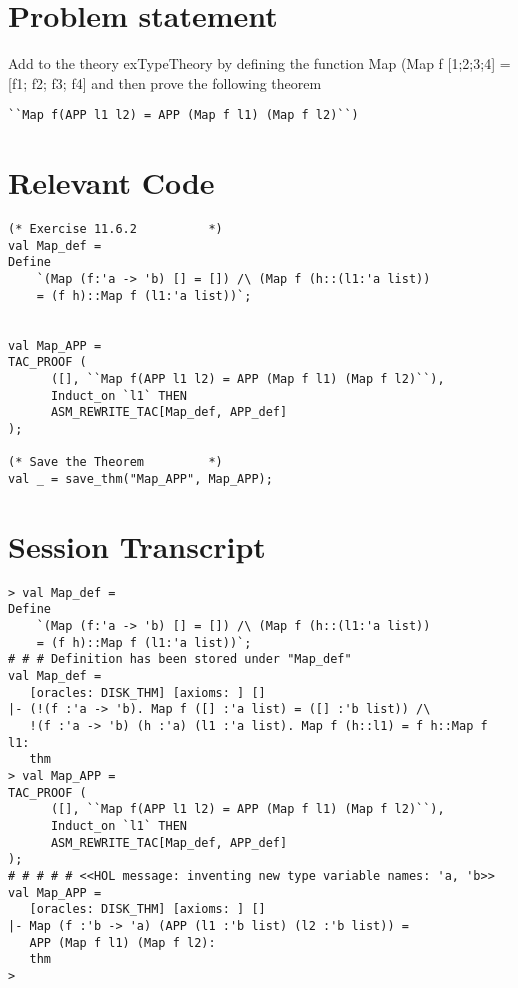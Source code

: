 \documentclass{report}
\begin{document}
\section{Problem statement}
\label{problem-statement-11-6-2}
Add to the theory exTypeTheory by defining the function Map (Map f
[1;2;3;4] = [f1; f2; f3; f4] and then prove the following theorem
\begin{lstlisting}[frame=tblr]
``Map f(APP l1 l2) = APP (Map f l1) (Map f l2)``)
\end{lstlisting}

\section{Relevant Code}
\label{rel-code-11-6-2}
\begin{lstlisting}[frame=TBlr]
(* Exercise 11.6.2			*)
val Map_def =
Define
	`(Map (f:'a -> 'b) [] = []) /\ (Map f (h::(l1:'a list))
	= (f h)::Map f (l1:'a list))`;


val Map_APP =
TAC_PROOF (
	  ([], ``Map f(APP l1 l2) = APP (Map f l1) (Map f l2)``),
	  Induct_on `l1` THEN
	  ASM_REWRITE_TAC[Map_def, APP_def]
);

(* Save the Theorem			*)
val _ = save_thm("Map_APP", Map_APP);
\end{lstlisting}

\section{Session Transcript}
\label{trans-11-6-2}
\begin{session}
  \begin{scriptsize}
\begin{verbatim}
> val Map_def =
Define
	`(Map (f:'a -> 'b) [] = []) /\ (Map f (h::(l1:'a list))
	= (f h)::Map f (l1:'a list))`;
# # # Definition has been stored under "Map_def"
val Map_def =
   [oracles: DISK_THM] [axioms: ] []
|- (!(f :'a -> 'b). Map f ([] :'a list) = ([] :'b list)) /\
   !(f :'a -> 'b) (h :'a) (l1 :'a list). Map f (h::l1) = f h::Map f l1:
   thm
> val Map_APP =
TAC_PROOF (
	  ([], ``Map f(APP l1 l2) = APP (Map f l1) (Map f l2)``),
	  Induct_on `l1` THEN
	  ASM_REWRITE_TAC[Map_def, APP_def]
);
# # # # # <<HOL message: inventing new type variable names: 'a, 'b>>
val Map_APP =
   [oracles: DISK_THM] [axioms: ] []
|- Map (f :'b -> 'a) (APP (l1 :'b list) (l2 :'b list)) =
   APP (Map f l1) (Map f l2):
   thm
> 
\end{verbatim}
  \end{scriptsize}
\end{session}
\end{document}
